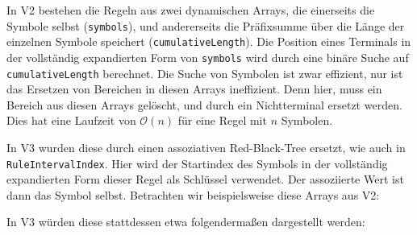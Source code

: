 In V2 bestehen die Regeln aus zwei dynamischen Arrays, die einerseits die Symbole selbst (\texttt{symbols}), und andererseits die Präfixsumme über die Länge der einzelnen Symbole speichert (\texttt{cumulativeLength}).
Die Position eines Terminals in der vollständig expandierten Form von \texttt{symbols} wird durch eine binäre Suche auf \texttt{cumulativeLength} berechnet. Die Suche von Symbolen ist zwar effizient, nur ist das Ersetzen von Bereichen in diesen Arrays ineffizient. Denn hier, muss ein Bereich aus diesen Arrays gelöscht, und durch ein Nichtterminal ersetzt werden. Dies hat eine Laufzeit von $\mathcal{O}(n)$ für eine Regel mit $n$ Symbolen.

In V3 wurden diese durch einen assoziativen Red-Black-Tree ersetzt, wie auch in \texttt{RuleIntervalIndex}. Hier wird der Startindex des Symbols in der vollständig expandierten Form dieser Regel als Schlüssel verwendet. Der assoziierte Wert ist dann das Symbol selbst. Betrachten wir beispielsweise diese Arrays aus V2:

\begin{figure}[H]
	\centering
	\quad
\end{figure}

In V3 würden diese stattdessen etwa folgendermaßen dargestellt werden:

\begin{figure}[H]
	\centering
\end{figure}

